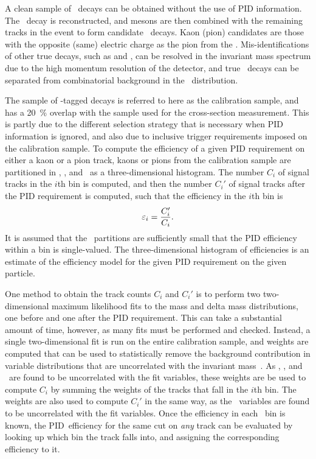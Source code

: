 A clean sample of \DzToKpi\ decays can be obtained without the use of \ac{PID} 
information.
The \DzToKpi\ decay is reconstructed, and \PDzero mesons are then combined with 
the remaining tracks in the event to form candidate \DstToDzpi\ decays.
Kaon (pion) candidates are those with the opposite (same) electric charge as 
the pion from the \PDstarp.
Mis-identifications of other true \PDzero decays, such as 
\decay{\PDzero}{\Ppiplus\Ppiminus} and \decay{\PDzero}{\PKplus\PKminus}, can be 
resolved in the \PDzero invariant mass spectrum due to the high momentum 
resolution of the detector, and true \PDstarp\ decays can be separated from 
combinatorial background in the \deltam\ distribution.

The sample of \PDstarp-tagged \PDzero decays is referred to here as the 
calibration sample, and has a \SI{20}{\percent} overlap with the sample used 
for the cross-section measurement.
This is partly due to the different selection strategy that is necessary when 
\ac{PID} information is ignored, and also due to inclusive trigger requirements 
imposed on the calibration sample.
To compute the efficiency of a given \ac{PID} requirement on either a kaon or a 
pion track, kaons or pions from the calibration sample are partitioned in 
\ptot, \Eta, and \nspd\ as a three-dimensional histogram.
The number $C_{i}$ of signal tracks in the $i$th bin is computed, and then the 
number $C_{i}'$  of signal tracks after the \ac{PID} requirement is computed, 
such that the efficiency in the $i$th bin is
\begin{equation}
  \varepsilon_{i} = \frac{C_{i}'}{C_{i}}.
\end{equation}
It is assumed that the \ptotetanspd\ partitions are sufficiently small that the 
\ac{PID} efficiency within a bin is single-valued.
The three-dimensional histogram of efficiencies is an estimate of the 
efficiency model for the given \ac{PID} requirement on the given particle.

One method to obtain the track counts $C_{i}$ and $C_{i}'$ is to perform two 
two-dimensional maximum likelihood fits to the \PDzero mass and delta mass 
distributions, one before and one after the \ac{PID} requirement.
This can take a substantial amount of time, however, as many fits must be 
performed and checked.
Instead, a single two-dimensional fit is run on the entire calibration sample, 
and weights are computed that can be used to statistically remove the 
background contribution in variable distributions that are uncorrelated with 
the invariant mass~\cite{Pivk:2004ty}.
As \ptot, \Eta, and \nspd\ are found to be uncorrelated with the fit variables, 
these weights are be used to compute $C_{i}$ by summing the weights of the 
tracks that fall in the $i$th bin.
The weights are also used to compute $C_{i}'$ in the same way, as the \dll\ 
variables are found to be uncorrelated with the fit variables.
Once the efficiency in each \ptotetanspd\ bin is known, the \ac{PID}\ 
efficiency for the same cut on \emph{any} track can be evaluated by looking up 
which bin the track falls into, and assigning the corresponding efficiency to 
it.

